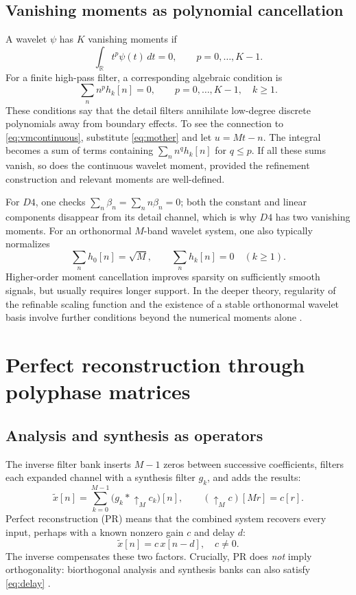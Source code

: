 \documentclass{article}
\theoremstyle{definition}
\theoremstyle{remark}
\newcommand{\R}{\mathbb R}
\begin{document}
\subsection{Vanishing moments as polynomial cancellation}
A wavelet $\psi$ has $K$ vanishing moments if
\begin{equation}
 \int_{\R}t^p\psi(t)\,dt=0,
 \qquad p=0,\ldots,K-1.
 \label{eq:vmcontinuous}
\end{equation}
For a finite high-pass filter, a corresponding algebraic condition is
\begin{equation}
 \sum_n n^p h_k[n]=0,
 \qquad p=0,\ldots,K-1,\quad k\ge1.
 \label{eq:vmdiscrete}
\end{equation}
These conditions say that the detail filters annihilate low-degree discrete polynomials away from boundary effects. To see the connection to \eqref{eq:vmcontinuous}, substitute \eqref{eq:mother} and let $u=Mt-n$. The integral becomes a sum of terms containing $\sum_n n^q h_k[n]$ for $q\le p$. If all these sums vanish, so does the continuous wavelet moment, provided the refinement construction and relevant moments are well-defined.

For $D4$, one checks $\sum_n\beta_n=\sum_n n\beta_n=0$; both the constant and linear components disappear from its detail channel, which is why $D4$ has two vanishing moments. For an orthonormal $M$-band wavelet system, one also typically normalizes
\begin{equation}
\sum_n h_0[n]=\sqrt M,
\qquad \sum_n h_k[n]=0\quad(k\ge1).
\label{eq:dccondition}
\end{equation}
Higher-order moment cancellation improves sparsity on sufficiently smooth signals, but usually requires longer support. In the deeper theory, regularity of the refinable scaling function and the existence of a stable orthonormal wavelet basis involve further conditions beyond the numerical moments alone \cite{daubechies1992,steffen1993}.

\section{Perfect reconstruction through polyphase matrices}
\subsection{Analysis and synthesis as operators}
The inverse filter bank inserts $M-1$ zeros between successive coefficients, filters each expanded channel with a synthesis filter $g_k$, and adds the results:
\begin{equation}
\widetilde x[n]=\sum_{k=0}^{M-1}\bigl(g_k*\uparrow_M c_k\bigr)[n],
\qquad
(\uparrow_M c)[Mr]=c[r].
\label{eq:synthesis}
\end{equation}
Perfect reconstruction (PR) means that the combined system recovers every input, perhaps with a known nonzero gain $c$ and delay $d$:
\begin{equation}
\widetilde x[n]=c\,x[n-d],\quad c\ne0.
\label{eq:delay}
\end{equation}
The inverse compensates these two factors. Crucially, PR does \emph{not} imply orthogonality: biorthogonal analysis and synthesis banks can also satisfy \eqref{eq:delay} \cite{vaidyanathan1993,vetterli1995}.
\end{document}

